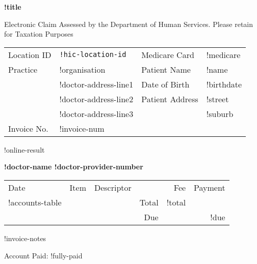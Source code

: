 \documentclass[12pt]{article}
\begin{document}
\begin{center}
{\bf \Large !title}

\vspace{3mm}

{\footnotesize Electronic Claim Assessed by the Department of Human Services. 
  Please retain for Taxation Purposes }

\end{center}

\vspace{8mm}

\begin{tabular}{llll}
  Location ID & \texttt{!hic-location-id} & Medicare Card & !medicare \\
  Practice & !organisation & Patient Name & !name \\
  & !doctor-address-line1 & Date of Birth & !birthdate \\
  & !doctor-address-line2 & Patient Address & !street \\
  & !doctor-address-line3 & & !suburb \\
 Invoice No. & !invoice-num & & \\
\end{tabular}

\vspace{3mm}

!online-result

\vspace{3mm}

{\bf !doctor-name !doctor-provider-number}

\vspace{3mm}

\begin{tabularx}{\textwidth}{llp{50mm}rrr}
Date & Item & Descriptor & & Fee & Payment \\ \cmidrule(l){1-6}
!accounts-table
\cmidrule(l){5-6}
& & & Total & !total  & \\
& & & Due & & !due \\
\end{tabularx}

!invoice-notes

\vspace{3mm}

Account Paid: !fully-paid
\end{document}
